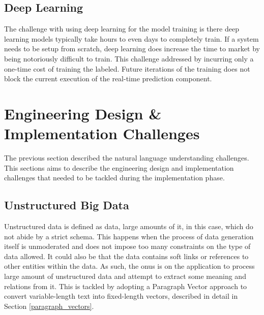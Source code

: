 \documentclass[conference]{IEEEtran}
\begin{document}
    \subsection{Deep Learning}
        The challenge with using deep learning for the model training is there deep learning models typically take hours to even days to completely train. 
        If a system needs to be setup from scratch, deep learning does increase the time to market by being notoriously difficult to train. 
        This challenge addressed by incurring only a one-time cost of training the labeled. Future iterations of the training does not block the current execution of the real-time prediction component.

\vspace{5mm}

\section{Engineering Design \& Implementation Challenges}
    The previous section described the natural language understanding challenges. This sections aims to describe the engineering design and implementation challenges that needed to be tackled during the implementation phase.

    \subsection{Unstructured Big Data}
        Unstructured data is defined as data, large amounts of it, in this case, which do not abide by a strict schema\cite{buneman1996query}. 
        This happens when the process of data generation itself is unmoderated and does not impose too many constraints on the type of data allowed. 
        It could also be that the data contains soft links or references to other entities within the data. 
        As such, the onus is on the application to process large amount of unstructured data and attempt to extract some meaning and relations from it.
        This is tackled by adopting a Paragraph Vector approach to convert variable-length text into fixed-length vectors, described in detail in Section \ref{paragraph_vectors}.
\end{document}
